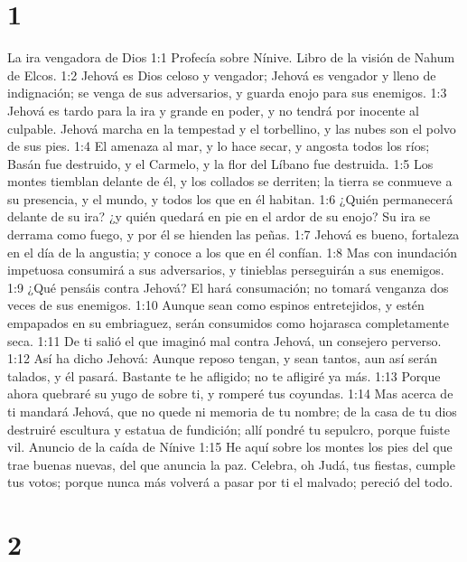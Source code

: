 
\chapter{1}

La ira vengadora de Dios  
1:1 Profecía sobre Nínive. Libro de la visión de Nahum de Elcos.  
1:2 Jehová es Dios celoso y vengador; Jehová es vengador y lleno de indignación; se venga de sus adversarios, y guarda enojo para sus enemigos.  
1:3 Jehová es tardo para la ira y grande en poder, y no tendrá por inocente al culpable. Jehová marcha en la tempestad y el torbellino, y las nubes son el polvo de sus pies.  
1:4 El amenaza al mar, y lo hace secar, y angosta todos los ríos; Basán fue destruido, y el Carmelo, y la flor del Líbano fue destruida.  
1:5 Los montes tiemblan delante de él, y los collados se derriten; la tierra se conmueve a su presencia, y el mundo, y todos los que en él habitan.  
1:6 ¿Quién permanecerá delante de su ira? ¿y quién quedará en pie en el ardor de su enojo? Su ira se derrama como fuego, y por él se hienden las peñas.  
1:7 Jehová es bueno, fortaleza en el día de la angustia; y conoce a los que en él confían.  
1:8 Mas con inundación impetuosa consumirá a sus adversarios, y tinieblas perseguirán a sus enemigos.  
1:9 ¿Qué pensáis contra Jehová? El hará consumación; no tomará venganza dos veces de sus enemigos.  
1:10 Aunque sean como espinos entretejidos, y estén empapados en su embriaguez, serán consumidos como hojarasca completamente seca.  
1:11 De ti salió el que imaginó mal contra Jehová, un consejero perverso.  
1:12 Así ha dicho Jehová: Aunque reposo tengan, y sean tantos, aun así serán talados, y él pasará. Bastante te he afligido; no te afligiré ya más.  
1:13 Porque ahora quebraré su yugo de sobre ti, y romperé tus coyundas.  
1:14 Mas acerca de ti mandará Jehová, que no quede ni memoria de tu nombre; de la casa de tu dios destruiré escultura y estatua de fundición; allí pondré tu sepulcro, porque fuiste vil.  
Anuncio de la caída de Nínive  
1:15 He aquí sobre los montes los pies del que trae buenas nuevas, del que anuncia la paz. Celebra, oh Judá, tus fiestas, cumple tus votos; porque nunca más volverá a pasar por ti el malvado; pereció del todo.  

\chapter{2}

